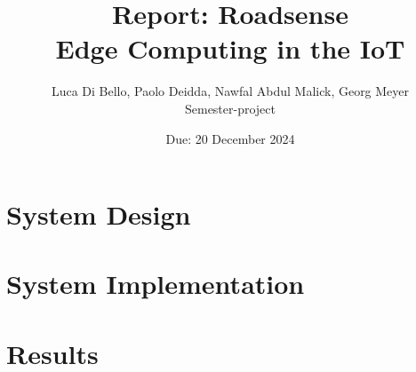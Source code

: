 \documentclass[12pt,a4paper]{report}
\title{Report: Roadsense \\ \vspace{0.5em}
\Large Edge Computing in the IoT}
\author{Luca Di Bello, Paolo Deidda, Nawfal Abdul Malick, Georg Meyer \\[1em]
Semester-project}
\date{Due: 20 December 2024}
\begin{document}
\maketitle

\tableofcontents
\listoffigures

\chapter{System Design}





\chapter{System Implementation}







\chapter{Results}




\end{document}
